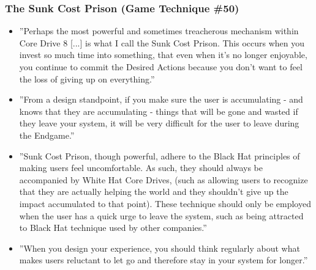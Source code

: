     \subsubsection{The Sunk Cost Prison (Game Technique \#50)}
        \begin{itemize}
            \item ''Perhaps the most powerful and sometimes treacherous mechanism within Core Drive 8 [...] is what I call the Sunk Cost Prison. This occurs when you invest so much time into something, that even when it's no longer enjoyable, you continue to commit the Desired Actions because you don't want to feel the loss of giving up on everything.''
            \item ''From a design standpoint, if you make sure the user is accumulating - and knows that they are accumulating - things that will be gone and wasted if they leave your system, it will be very difficult for the user to leave during the Endgame.''
            \item ''Sunk Cost Prison, though powerful, adhere to the Black Hat principles of making users feel uncomfortable. As such, they should always be accompanied by White Hat Core Drives, (such as allowing users to recognize that they are actually helping the world and they shouldn't give up the impact accumulated to that point). These technique should only be employed when the user has a quick urge to leave the system, such as being attracted to Black Hat technique used by other companies.''
            \item ''When you design your experience, you should think regularly about what makes users reluctant to let go and therefore stay in your system for longer.''
        \end{itemize}
